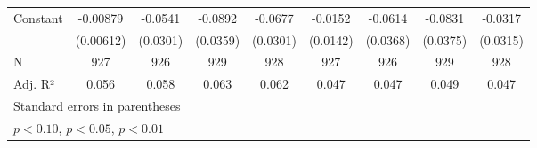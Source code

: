 {\begin{tabular}{l*{8}{c}}
Constant            &    -0.00879         &     -0.0541\sym{*}  &     -0.0892\sym{**} &     -0.0677\sym{**} &     -0.0152         &     -0.0614\sym{*}  &     -0.0831\sym{**} &     -0.0317         \\
                    &   (0.00612)         &    (0.0301)         &    (0.0359)         &    (0.0301)         &    (0.0142)         &    (0.0368)         &    (0.0375)         &    (0.0315)         \\
\hline
N                   &         927         &         926         &         929         &         928         &         927         &         926         &         929         &         928         \\
Adj. R²             &       0.056         &       0.058         &       0.063         &       0.062         &       0.047         &       0.047         &       0.049         &       0.047         \\
\hline\hline
\multicolumn{9}{l}{\footnotesize Standard errors in parentheses}\\
\multicolumn{9}{l}{\footnotesize \sym{*} \(p<0.10\), \sym{**} \(p<0.05\), \sym{***} \(p<0.01\)}\\
\end{tabular}
}
